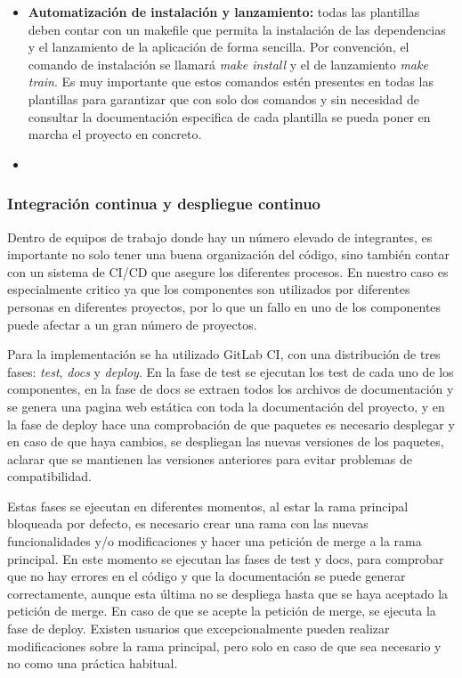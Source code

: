 \begin{itemize}
    \item \textbf{Automatización de instalación y lanzamiento:} todas las plantillas
    deben contar con un makefile que permita la instalación de las dependencias y
    el lanzamiento de la aplicación de forma sencilla. Por convención, el comando
    de instalación se llamará \textit{make install} y el de lanzamiento \textit{make train}.
    Es muy importante que estos comandos estén presentes en todas las plantillas para
    garantizar que con solo dos comandos y sin necesidad de consultar la documentación
    especifica de cada plantilla se pueda poner en marcha el proyecto en concreto.
    \item \textbf{}
\end{itemize}

\subsubsection{Integración continua y despliegue continuo}
Dentro de equipos de trabajo donde hay un número elevado de integrantes, es
importante no solo tener una buena organización del código, sino también
contar con un sistema de CI/CD que asegure los diferentes procesos. En nuestro
caso es especialmente critico ya que los componentes son utilizados por
diferentes personas en diferentes proyectos, por lo que un fallo en uno de
los componentes puede afectar a un gran número de proyectos.\medskip

Para la implementación se ha utilizado GitLab CI, con una distribución de 
tres fases: \textit{test}, \textit{docs} y \textit{deploy}. En la fase de test
se ejecutan los test de cada uno de los componentes, en la fase de docs se
extraen todos los archivos de documentación y se genera una pagina web estática
con toda la documentación del proyecto, y en la fase de deploy hace una comprobación
de que paquetes es necesario desplegar y en caso de que haya cambios, se despliegan
las nuevas versiones de los paquetes, aclarar que se mantienen las versiones anteriores
para evitar problemas de compatibilidad.\medskip

Estas fases se ejecutan en diferentes momentos, al estar la rama principal bloqueada
por defecto, es necesario crear una rama con las nuevas funcionalidades y/o modificaciones
y hacer una petición de merge a la rama principal. En este momento se ejecutan las fases
de test y docs, para comprobar que no hay errores en el código y que la documentación
se puede generar correctamente, aunque esta última no se despliega hasta que se haya
aceptado la petición de merge. En caso de que se acepte la petición de merge, se ejecuta
la fase de deploy. Existen usuarios que excepcionalmente pueden realizar modificaciones
sobre la rama principal, pero solo en caso de que sea necesario y no como una práctica
habitual. 